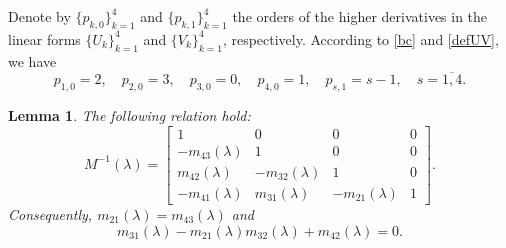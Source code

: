\documentclass[a4paper,12pt]{article}
\newcommand{\la}{\lambda}
\theoremstyle{plain}
\numberwithin{equation}{section}
\newtheorem{lem}[thm]{Lemma}
\theoremstyle{definition}
\theoremstyle{remark}
\begin{document}
Denote by $\{ p_{k,0} \}_{k = 1}^4$ and $\{ p_{k,1} \}_{k = 1}^4$ the orders of the higher derivatives in the linear forms $\{ U_k \}_{k = 1}^4$ and $\{ V_k \}_{k = 1}^4$, respectively. According to \eqref{bc} and \eqref{defUV}, we have 
\begin{equation} \label{defp} 
p_{1,0} = 2, \quad p_{2,0} = 3, \quad p_{3,0} = 0, \quad p_{4,0} = 1, \quad p_{s,1} = s-1, \quad s = \overline{1,4}.
\end{equation}


\begin{lem} \label{lem:invM}
The following relation hold:
\begin{equation} \label{invM}
M^{-1}(\la) = \begin{bmatrix}
                   1 & 0 & 0 & 0 \\
                   -m_{43}(\la) & 1 & 0 & 0 \\
                   m_{42}(\la) & -m_{32}(\la) & 1 & 0 \\
                   -m_{41}(\la) & m_{31}(\la) & -m_{21}(\la) & 1
              \end{bmatrix}.
\end{equation}
Consequently, $m_{21}(\la) = m_{43}(\la)$ and
\begin{equation} \label{relm31}
m_{31}(\la) - m_{21}(\la) m_{32}(\la) + m_{42}(\la) = 0.
\end{equation}
\end{lem}
\end{document}
